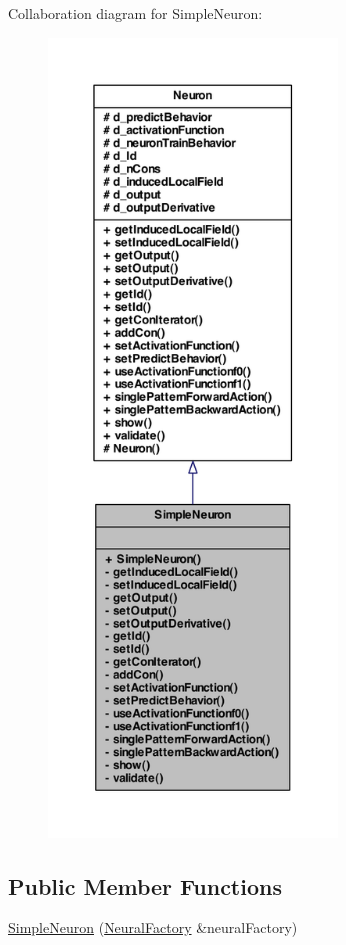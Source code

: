 Collaboration diagram for SimpleNeuron:
\nopagebreak
\begin{figure}[H]
\begin{center}
\leavevmode
\includegraphics[height=600pt]{class_simple_neuron__coll__graph}
\end{center}
\end{figure}
\subsection*{Public Member Functions}
\begin{DoxyCompactItemize}
\item 
\hyperlink{class_simple_neuron_adb0becb30ddc511aba5cc7cadea9d981}{SimpleNeuron} (\hyperlink{class_neural_factory}{NeuralFactory} \&neuralFactory)
\end{DoxyCompactItemize}
